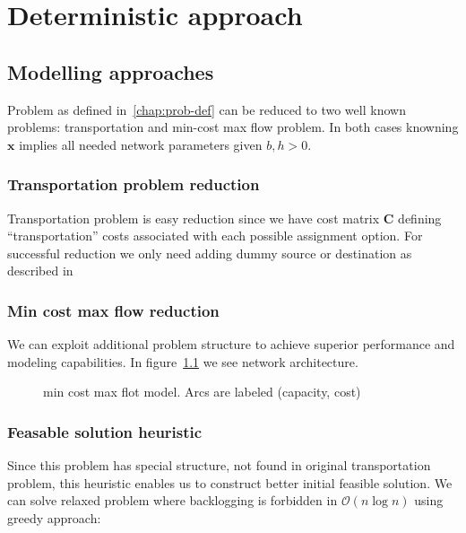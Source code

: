 
\chapter{Deterministic approach}
\label{chap:Deterministic approach}

\section{Modelling approaches}

Problem as defined in~\ref{chap:prob-def} can be reduced to two well known problems: transportation and min-cost max flow problem. In both cases knowning $\mathbf{x}$ implies all needed network parameters given $b, h > 0$.

\subsection{Transportation problem reduction}
\label{subs:Transportation problem reduction}

Transportation problem \autocite{or-textbook} is easy reduction since we have cost matrix $\mathbf{C}$ defining ``transportation'' costs associated with each possible assignment option. For successful reduction we only need adding dummy source or destination as described in \autocite{or-textbook}


\subsection{Min cost max flow reduction}
\label{sub:Min cost max flow reduction}

We can exploit additional problem structure to achieve superior performance and modeling capabilities. In figure~\ref{fig:mcmf-model} we see network architecture.

\begin{figure}[h]
    \label{fig:mcmf-model}
    \centering
    
    \caption{min cost max flot model. Arcs are labeled (capacity, cost)}
\end{figure}

\subsection{Feasable solution heuristic}
\label{subs:Feasable solution heuristic}
Since this problem has special structure, not found in original transportation problem, this heuristic enables us to construct better initial feasible solution. We can solve relaxed problem where backlogging is forbidden in $\mathcal{O}(n \log{} n)$ using greedy approach:

